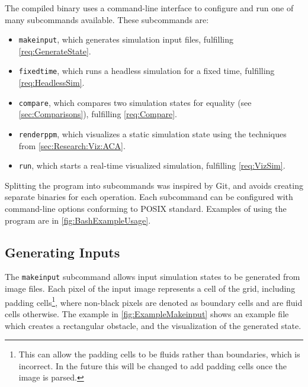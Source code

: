 The compiled binary uses a command-line interface to configure and run one of many subcommands available.
These subcommands are:\label{sec:DesignSubcommands}
\begin{itemize}
    \item \texttt{makeinput}, which generates simulation input files, fulfilling \cref{req:GenerateState}.
    \item \texttt{fixedtime}, which runs a headless simulation for a fixed time, fulfilling \cref{req:HeadlessSim}.
    \item \texttt{compare}, which compares two simulation states for equality (see \cref{sec:Comparisons}), fulfilling \cref{req:Compare}.
    \item \texttt{renderppm}, which visualizes a static simulation state using the techniques from \cref{sec:Research:Viz:ACA}.
    \item \texttt{run}, which starts a real-time visualized simulation, fulfilling \cref{req:VizSim}.
\end{itemize}
Splitting the program into subcommands was inspired by Git\cite{tool:Git}, and avoids creating separate binaries for each operation.
Each subcommand can be configured with command-line options conforming to POSIX standard\cite{IEEE2018UtilityConventions}.
Examples of using the program are in \cref{fig:BashExampleUsage}.


\subsection{Generating Inputs}
The \texttt{makeinput} subcommand allows input simulation states to be generated from image files.
Each pixel of the input image represents a cell of the grid, including padding cells\footnote{This can allow the padding cells to be fluids rather than boundaries, which is incorrect. In the future this will be changed to add padding cells once the image is parsed.}, where non-black pixels are denoted as boundary cells and are fluid cells otherwise.
The example in \cref{fig:ExampleMakeinput} shows an example file which creates a rectangular obstacle, and the visualization of the generated state.


